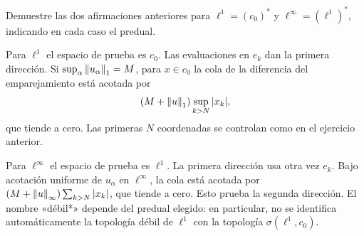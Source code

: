 \begin{ejercicio}\label{ej:v3-l16-5}
Demuestre las dos afirmaciones anteriores para $\ell^1=(c_0)^*$ y $\ell^\infty=(\ell^1)^*$, indicando en cada caso el predual.
\end{ejercicio}
\begin{solucion}
Para $\ell^1$ el espacio de prueba es $c_0$. Las evaluaciones en $e_k$ dan la primera dirección. Si $\sup_\alpha\left\lVert u_\alpha\right\rVert_1=M$, para $x\in c_0$ la cola de la diferencia del emparejamiento está acotada por
\[
 (M+\left\lVert u\right\rVert_1)\sup_{k>N}|x_k|,
\]
que tiende a cero. Las primeras $N$ coordenadas se controlan como en el ejercicio anterior.

Para $\ell^\infty$ el espacio de prueba es $\ell^1$. La primera dirección usa otra vez $e_k$. Bajo acotación uniforme de $u_\alpha$ en $\ell^\infty$, la cola está acotada por
$(M+\left\lVert u\right\rVert_\infty)\sum_{k>N}|x_k|$, que tiende a cero. Esto prueba la segunda dirección. El nombre «débil*» depende del predual elegido: en particular, no se identifica automáticamente la topología débil de $\ell^1$ con la topología $\sigma(\ell^1,c_0)$.
\end{solucion}

